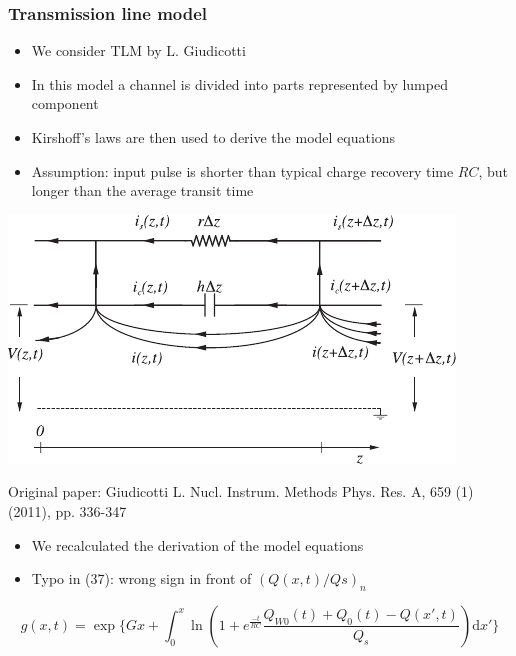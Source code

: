 \documentclass{beamer}
\begin{document}
    \begin{frame}
        \frametitle{Transmission line model}
        \begin{itemize}
            \item We consider TLM by L. Giudicotti
            \item In this model a channel is divided into parts represented by lumped component
            \item Kirshoff's laws are then used to derive the model equations
            \item Assumption: input pulse is shorter than typical charge recovery time $RC$,
                    but longer than the average transit time
        \end{itemize}
        \begin{minipage}{0.4\linewidth}
            \includegraphics[scale=0.8]{"TLM-scheme.pdf"}
        \end{minipage}
        \hspace{50pt}
        \begin{minipage}{0.4\linewidth}
            {\tiny Original paper: Giudicotti L. Nucl. Instrum. Methods Phys. Res. A, 659 (1)
(2011), pp. 336-347}

            \begin{itemize}
                \item We recalculated the derivation of the model equations
                \item Typo in (37): wrong sign in front of $(Q(x, t)/Qs)_n$
            \end{itemize}

        \end{minipage}

        \begin{equation*}
                g(x, t) = \exp{\{Gx + \int^x_0\ln{\left(1 + e^\frac{-t}{RC} \frac{Q_{W0}(t) + Q_0(t) - Q(x', t)}{Q_s} \right)} \text{d}x' \}}
        \end{equation*}
    \end{frame}
\end{document}
